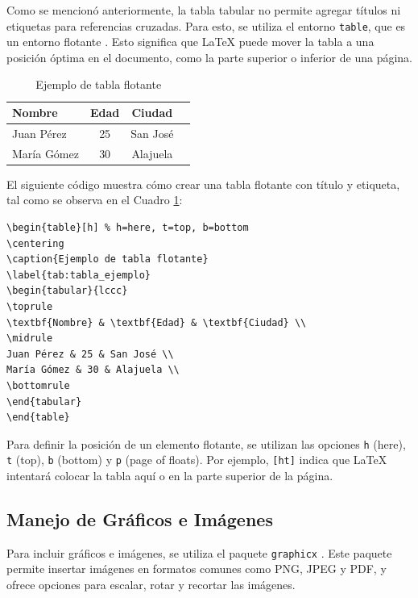 Como se mencionó anteriormente, la tabla tabular no permite agregar títulos ni etiquetas para referencias cruzadas. Para esto, se utiliza el entorno \texttt{table}, que es un entorno flotante \cite{latex_project}. Esto significa que LaTeX puede mover la tabla a una posición óptima en el documento, como la parte superior o inferior de una página.

\begin{table}[h]
\centering
\caption{Ejemplo de tabla flotante}
\label{tab:tabla_ejemplo}
\begin{tabular}{lccc}
\toprule
\textbf{Nombre} & \textbf{Edad} & \textbf{Ciudad} \\
\midrule
Juan Pérez & 25 & San José \\
María Gómez & 30 & Alajuela \\
\bottomrule
\end{tabular}
\end{table}

El siguiente código muestra cómo crear una tabla flotante con título y etiqueta, tal como se observa en el Cuadro \ref{tab:tabla_ejemplo}:

\begin{verbatim}
\begin{table}[h] % h=here, t=top, b=bottom
\centering
\caption{Ejemplo de tabla flotante}
\label{tab:tabla_ejemplo}
\begin{tabular}{lccc}
\toprule
\textbf{Nombre} & \textbf{Edad} & \textbf{Ciudad} \\
\midrule
Juan Pérez & 25 & San José \\
María Gómez & 30 & Alajuela \\
\bottomrule
\end{tabular}
\end{table}
\end{verbatim}

Para definir la posición de un elemento flotante, se utilizan las opciones \texttt{h} (here), \texttt{t} (top), \texttt{b} (bottom) y \texttt{p} (page of floats). Por ejemplo, \texttt{[ht]} indica que LaTeX intentará colocar la tabla aquí o en la parte superior de la página.

\subsection{Manejo de Gráficos e Imágenes}

Para incluir gráficos e imágenes, se utiliza el paquete \texttt{graphicx} \cite{graphicx}. Este paquete permite insertar imágenes en formatos comunes como PNG, JPEG y PDF, y ofrece opciones para escalar, rotar y recortar las imágenes.

